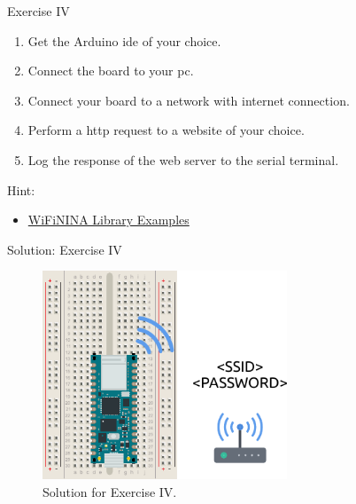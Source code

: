 \begin{frame}
    \begin{exampleblock}{Exercise IV}
        \begin{enumerate}
            \item Get the Arduino\textregistered{} \acs{ide} of your choice.
            \item Connect the board to your \acs{pc}.
            \item Connect your board to a network with internet connection.
            \item Perform a \acs{http} request to a website of your choice.
            \item Log the response of the web server to the serial terminal.
        \end{enumerate}
        \par Hint:
        \begin{itemize}
            \item \href{https://docs.arduino.cc/tutorials/communication/wifi-nina-examples}{WiFiNINA Library Examples}
        \end{itemize}
    \end{exampleblock}
\end{frame}

\begin{frame}{Solution: Exercise IV}
    \begin{figure}
        \includegraphics[width=0.65\textwidth]{images/microcontroller/exercises/exercise-4-solution.pdf}
        \caption{Solution for Exercise IV.}
    \end{figure}
\end{frame}

